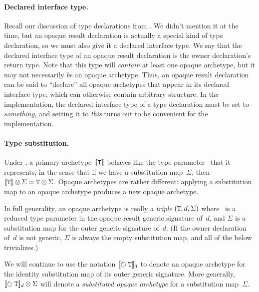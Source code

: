 \documentclass[../generics]{subfiles}
\begin{document}
\paragraph{Declared interface type.}
Recall our discussion of type declarations from . We didn't mention it at the time, but an opaque result declaration is actually a special kind of type declaration, so we must also give it a declared interface type. We say that the declared interface type of an opaque result declaration is the owner declaration's return type. Note that this type will \emph{contain} at least one opaque archetype, but it may not necessarily \emph{be} an opaque archetype. Thus, an opaque result declaration can be said to ``declare'' all opaque archetypes that appear in its declared interface type, which can otherwise contain arbitrary structure. In the implementation, the declared interface type of a type declaration must be set to \emph{something}, and setting it to \emph{this} turns out to be convenient for the implementation.

\paragraph{Type substitution.}
Under , a primary archetype~$[\![\texttt{T}]\!]$ behaves like the type parameter \tT\ that it represents, in the sense that if we have a substitution map~$\Sigma$, then $[\![\texttt{T}]\!] \otimes \Sigma = \texttt{T} \otimes \Sigma$. Opaque archetypes are rather different: applying a substitution map to an opaque archetype produces a new opaque archetype.

In full generality, an opaque archetype is really a \emph{triple} $(\texttt{T}, d, \Sigma)$ where \tT\ is a reduced type parameter in the opaque result generic signature of~$d$, and $\Sigma$ is a substitution map for the outer generic signature of~$d$. (If the owner declaration of~$d$ is not generic, $\Sigma$ is always the empty substitution map, and all of the below trivializes.)

\begin{definition}
We will continue to use the notation $[\![\circlearrowright \texttt{\texttt{T}}]\!]_d$ to denote an opaque archetype for the identity substitution map of its outer generic signature. More generally, $[\![\circlearrowright \texttt{\texttt{T}}]\!]_d \otimes\Sigma$ will denote a \emph{substituted opaque archetype} for a substitution map~$\Sigma$.
\end{definition}
\end{document}
